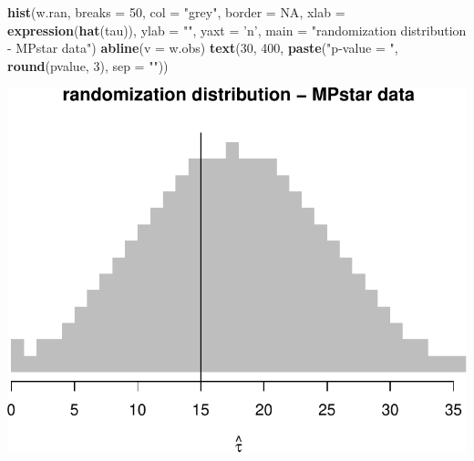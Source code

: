 \documentclass[]{article}
\newenvironment{Shaded}{\begin{snugshade}}{\end{snugshade}}
\newcommand{\KeywordTok}[1]{\textcolor[rgb]{0.13,0.29,0.53}{\textbf{#1}}}
\newcommand{\DataTypeTok}[1]{\textcolor[rgb]{0.13,0.29,0.53}{#1}}
\newcommand{\DecValTok}[1]{\textcolor[rgb]{0.00,0.00,0.81}{#1}}
\newcommand{\StringTok}[1]{\textcolor[rgb]{0.31,0.60,0.02}{#1}}
\newcommand{\OtherTok}[1]{\textcolor[rgb]{0.56,0.35,0.01}{#1}}
\newcommand{\NormalTok}[1]{#1}
\begin{document}
\begin{Shaded}
\begin{Highlighting}[]
\KeywordTok{hist}\NormalTok{(w.ran, }\DataTypeTok{breaks =} \DecValTok{50}\NormalTok{, }\DataTypeTok{col =} \StringTok{"grey"}\NormalTok{, }\DataTypeTok{border =} \OtherTok{NA}\NormalTok{,}
     \DataTypeTok{xlab =} \KeywordTok{expression}\NormalTok{(}\KeywordTok{hat}\NormalTok{(tau)), }
     \DataTypeTok{ylab =} \StringTok{""}\NormalTok{, }\DataTypeTok{yaxt =} \StringTok{'n'}\NormalTok{, }
     \DataTypeTok{main =} \StringTok{"randomization distribution - MPstar data"}\NormalTok{)}
\KeywordTok{abline}\NormalTok{(}\DataTypeTok{v =}\NormalTok{ w.obs)}
\KeywordTok{text}\NormalTok{(}\DecValTok{30}\NormalTok{, }\DecValTok{400}\NormalTok{, }
     \KeywordTok{paste}\NormalTok{(}\StringTok{"p-value = "}\NormalTok{, }\KeywordTok{round}\NormalTok{(pvalue, }\DecValTok{3}\NormalTok{), }\DataTypeTok{sep =} \StringTok{""}\NormalTok{))}
\end{Highlighting}
\end{Shaded}

\includegraphics{hw3_files/figure-latex/unnamed-chunk-4-2.pdf}
\end{document}
